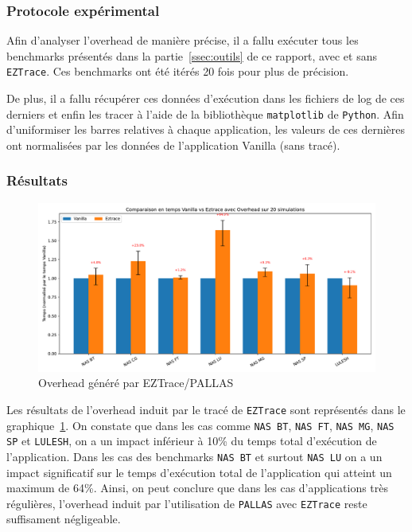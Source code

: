 \subsubsection{Protocole expérimental}\label{ssec:overhead_exp}

Afin d'analyser l'overhead de manière précise, il a fallu exécuter tous les benchmarks présentés dans la partie~\ref{ssec:outils} de ce rapport, avec et sans \verb!EZTrace!.
Ces benchmarks ont été itérés 20 fois pour plus de précision.

De plus, il a fallu récupérer ces données d'exécution dans les fichiers de log de ces derniers et enfin les tracer à l'aide de la bibliothèque \verb!matplotlib! de \verb!Python!.
Afin d'uniformiser les barres relatives à chaque application, les valeurs de ces dernières ont normalisées par les données de l'application Vanilla (sans tracé).

\subsubsection{Résultats}\label{ssec:overhead_res}

\begin{figure}[!h]
    \centering
    \includegraphics[width=1\textwidth]{img/overhead.pdf}
    \caption{Overhead généré par EZTrace/PALLAS}
    \label{fig:overhead}
\end{figure}

Les résultats de l'overhead induit par le tracé de \verb!EZTrace! sont représentés dans le graphique~\ref{fig:overhead}.
On constate que dans les cas comme \verb!NAS BT!, \verb!NAS FT!, \verb!NAS MG!, \verb!NAS SP! et \verb!LULESH!, on a un impact inférieur à 10\% du temps total d'exécution de l'application.
Dans les cas des benchmarks \verb!NAS BT! et surtout \verb!NAS LU! on a un impact significatif sur le temps d'exécution total de l'application qui atteint un maximum de 64\%.
Ainsi, on peut conclure que dans les cas d'applications très régulières, l'overhead induit par l'utilisation de \verb!PALLAS! avec \verb!EZTrace! reste suffisament négligeable.


